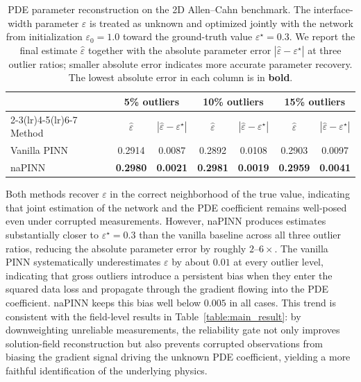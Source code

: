 \documentclass{article}
\theoremstyle{plain}
\theoremstyle{definition}
\theoremstyle{remark}
\begin{document}
\begin{sc}
\begin{table}[h]
\centering
\small
\caption{PDE parameter reconstruction on the 2D Allen--Cahn benchmark. The interface-width parameter $\varepsilon$ is treated as unknown and optimized jointly with the network from initialization $\varepsilon_{0}=1.0$ toward the ground-truth value $\varepsilon^{\star}=0.3$. We report the final estimate $\hat{\varepsilon}$ together with the absolute parameter error $|\hat{\varepsilon}-\varepsilon^{\star}|$ at three outlier ratios; smaller absolute error indicates more accurate parameter recovery. The lowest absolute error in each column is in \textbf{bold}.}
\label{tab:parameter_reconstruction}
\setlength{\tabcolsep}{5pt}
\begin{tabular}{lcccccc}
\toprule
& \multicolumn{2}{c}{5\% outliers} & \multicolumn{2}{c}{10\% outliers} & \multicolumn{2}{c}{15\% outliers} \\
\cmidrule(lr){2-3}\cmidrule(lr){4-5}\cmidrule(lr){6-7}
Method & $\hat{\varepsilon}$ & $|\hat{\varepsilon}-\varepsilon^{\star}|$ & $\hat{\varepsilon}$ & $|\hat{\varepsilon}-\varepsilon^{\star}|$ & $\hat{\varepsilon}$ & $|\hat{\varepsilon}-\varepsilon^{\star}|$ \\
\midrule
Vanilla PINN & 0.2914 & 0.0087 & 0.2892 & 0.0108 & 0.2903 & 0.0097 \\
naPINN       & \textbf{0.2980} & \textbf{0.0021} & \textbf{0.2981} & \textbf{0.0019} & \textbf{0.2959} & \textbf{0.0041} \\
\bottomrule
\end{tabular}%
\end{table}
\end{sc}

Both methods recover $\varepsilon$ in the correct neighborhood of the true value, indicating that joint estimation of the network and the PDE coefficient remains well-posed even under corrupted measurements. However, naPINN produces estimates substantially closer to $\varepsilon^{\star}=0.3$ than the vanilla baseline across all three outlier ratios, reducing the absolute parameter error by roughly $2$--$6\times$. The vanilla PINN systematically underestimates $\varepsilon$ by about $0.01$ at every outlier level, indicating that gross outliers introduce a persistent bias when they enter the squared data loss and propagate through the gradient flowing into the PDE coefficient. naPINN keeps this bias well below $0.005$ in all cases. This trend is consistent with the field-level results in Table~\ref{table:main_result}: by downweighting unreliable measurements, the reliability gate not only improves solution-field reconstruction but also prevents corrupted observations from biasing the gradient signal driving the unknown PDE coefficient, yielding a more faithful identification of the underlying physics.
\end{document}
